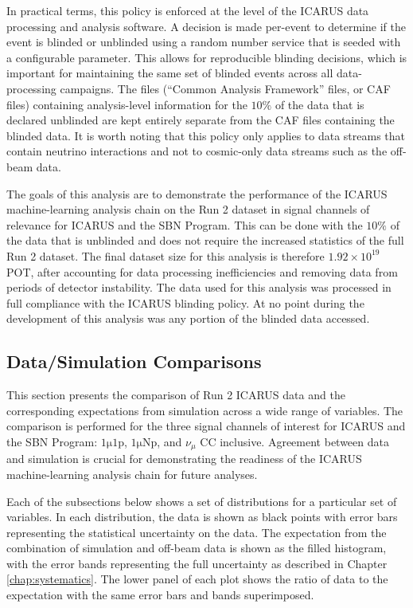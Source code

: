In practical terms, this policy is enforced at the level of the ICARUS data processing and analysis software. A decision is made per-event to determine if the event is blinded or unblinded using a random number service that is seeded with a configurable parameter. This allows for reproducible blinding decisions, which is important for maintaining the same set of blinded events across all data-processing campaigns. The files (``Common Analysis Framework'' files, or CAF files) containing analysis-level information for the $10\%$ of the data that is declared unblinded are kept entirely separate from the CAF files containing the blinded data. It is worth noting that this policy only applies to data streams that contain neutrino interactions and not to cosmic-only data streams such as the off-beam data.

The goals of this analysis are to demonstrate the performance of the ICARUS machine-learning analysis chain on the Run 2 dataset in signal channels of relevance for ICARUS and the SBN Program. This can be done with the $10\%$ of the data that is unblinded and does not require the increased statistics of the full Run 2 dataset. The final dataset size for this analysis is therefore $1.92 \times 10^{19}$ POT, after accounting for data processing inefficiencies and removing data from periods of detector instability. The data used for this analysis was processed in full compliance with the ICARUS blinding policy. At no point during the development of this analysis was any portion of the blinded data accessed. 

\subsection{Data/Simulation Comparisons}
\label{sec:data_comparisons}
This section presents the comparison of Run 2 ICARUS data and the corresponding expectations from simulation across a wide range of variables. The comparison is performed for the three signal channels of interest for ICARUS and the SBN Program: $\mathrm{1\mu 1p}$, $\mathrm{1\mu Np}$, and $\nu_\mu$ CC inclusive. Agreement between data and simulation is crucial for demonstrating the readiness of the ICARUS machine-learning analysis chain for future analyses. 

Each of the subsections below shows a set of distributions for a particular set of variables. In each distribution, the data is shown as black points with error bars representing the statistical uncertainty on the data. The expectation from the combination of simulation and off-beam data is shown as the filled histogram, with the error bands representing the full uncertainty as described in Chapter \ref{chap:systematics}. The lower panel of each plot shows the ratio of data to the expectation with the same error bars and bands superimposed.

